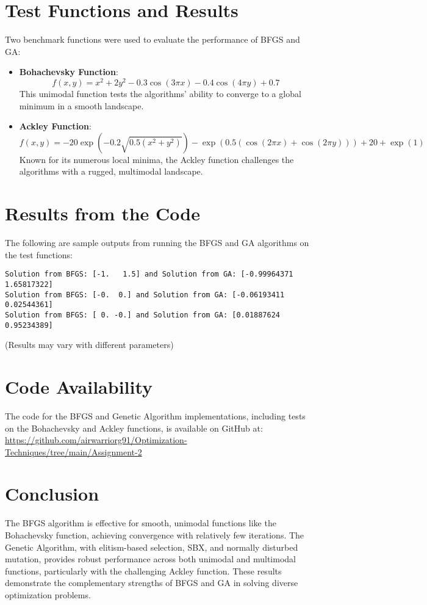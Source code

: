 \documentclass[12pt,a4paper,oneside]{paper} %
\begin{document}
\section{Test Functions and Results}

Two benchmark functions were used to evaluate the performance of BFGS and GA:

\begin{itemize}
    \item \textbf{Bohachevsky Function}: 
    \[
    f(x, y) = x^2 + 2y^2 - 0.3\cos(3\pi x) - 0.4\cos(4\pi y) + 0.7
    \]
    This unimodal function tests the algorithms' ability to converge to a global minimum in a smooth landscape.

    \item \textbf{Ackley Function}:
    \[
    f(x, y) = -20 \exp\left(-0.2 \sqrt{0.5(x^2 + y^2)}\right) - \exp\left(0.5(\cos(2\pi x) + \cos(2\pi y))\right) + 20 + \exp(1)
    \]
    Known for its numerous local minima, the Ackley function challenges the algorithms with a rugged, multimodal landscape.
\end{itemize}

\section{Results from the Code}

The following are sample outputs from running the BFGS and GA algorithms on the test functions:

\begin{verbatim}
Solution from BFGS: [-1.   1.5] and Solution from GA: [-0.99964371  1.65817322]
Solution from BFGS: [-0.  0.] and Solution from GA: [-0.06193411  0.02544361]
Solution from BFGS: [ 0. -0.] and Solution from GA: [0.01887624 0.95234389]
\end{verbatim}
(Results may vary with different parameters)

\section{Code Availability}

The code for the BFGS and Genetic Algorithm implementations, including tests on the Bohachevsky and Ackley functions, is available on GitHub at:  
\url{https://github.com/airwarriorg91/Optimization-Techniques/tree/main/Assignment-2}

\section{Conclusion}

The BFGS algorithm is effective for smooth, unimodal functions like the Bohachevsky function, achieving convergence with relatively few iterations. The Genetic Algorithm, with elitism-based selection, SBX, and normally disturbed mutation, provides robust performance across both unimodal and multimodal functions, particularly with the challenging Ackley function. These results demonstrate the complementary strengths of BFGS and GA in solving diverse optimization problems.

\end{document}
